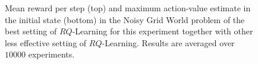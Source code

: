 \begin{figure}[t]
\begin{minipage}{\columnwidth}
\end{minipage}
  \caption[Noisy Grid World $RQ$-Learning variants comparison - 1]{Mean reward per step (top) and maximum action-value estimate in the initial state (bottom) in the Noisy Grid World problem of the best setting of $RQ$-Learning for this experiment together with other less effective setting of $RQ$-Learning. Results are averaged over $10000$ experiments.}
  \label{F:hasselt_QDecs}
\end{figure}
